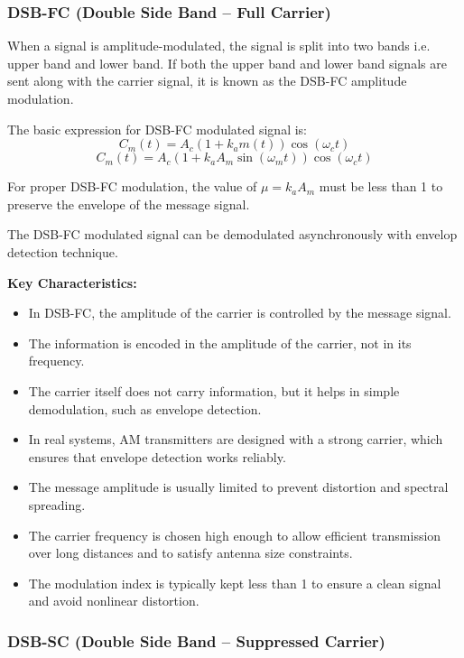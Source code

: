 \subsubsection*{DSB-FC (Double Side Band -- Full Carrier)}

When a signal is amplitude-modulated, the signal is split into two bands i.e. upper band and lower band. If both the upper band and lower band signals are sent along with the carrier signal, it is known as the DSB-FC amplitude modulation.

The basic expression for DSB-FC modulated signal is: 
\[C_m(t) = A_c \left( 1 + k_a m(t) \right) \cos(\omega_c t)\]
\[C_m(t) = A_c \left( 1 + k_a A_m \sin(\omega_m t) \right) \cos(\omega_c t)\]

For proper DSB-FC modulation, the value of $\mu = k_a A_m$ must be less than 1 to preserve the envelope of the message signal.

The DSB-FC modulated signal can be demodulated asynchronously with envelop detection technique.

\textbf{Key Characteristics:}

\begin{itemize}[itemsep=2pt]
\item In DSB-FC, the amplitude of the carrier is controlled by the message signal.  
\item The information is encoded in the amplitude of the carrier, not in its frequency.  
\item The carrier itself does not carry information, but it helps in simple demodulation, such as envelope detection.  
\item In real systems, AM transmitters are designed with a strong carrier, which ensures that envelope detection works reliably.  
\item The message amplitude is usually limited to prevent distortion and spectral spreading.  
\item The carrier frequency is chosen high enough to allow efficient transmission over long distances and to satisfy antenna size constraints.  
\item The modulation index is typically kept less than 1 to ensure a clean signal and avoid nonlinear distortion.  
\end{itemize}


\subsubsection*{DSB-SC (Double Side Band -- Suppressed Carrier)}

